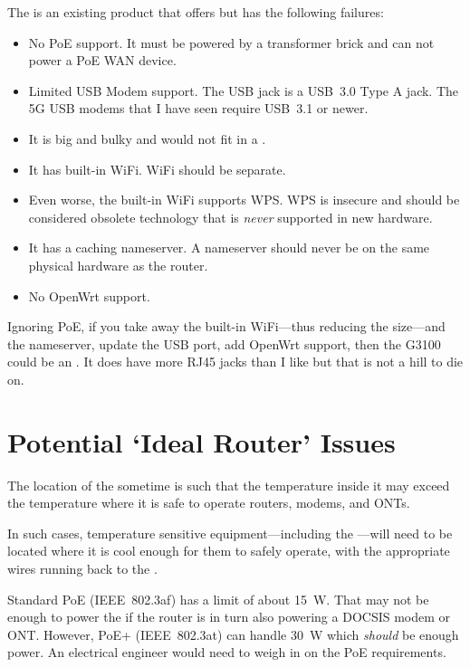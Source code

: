 The  is an existing product that offers  but has the
following failures:

\begin{itemize}
  \item No PoE support. It must be powered by a transformer brick and can not power a PoE WAN device.
  \item Limited USB Modem support. The USB jack is a USB~3.0 Type A jack. The 5G USB modems that I have seen
        require USB~3.1 or newer.
  \item It is big and bulky and would not fit in a \tcab{}.
  \item It has built-in WiFi. WiFi should be separate.
  \item Even worse, the built-in WiFi supports WPS. WPS is insecure and should be considered obsolete
        technology that is \emph{never} supported in new hardware.
  \item It has a caching nameserver. A nameserver should never be on the same physical hardware as the
        router.
  \item No OpenWrt support.
\end{itemize}

Ignoring PoE, if you take away the built-in WiFi---thus reducing the size---and the nameserver, update the USB port,
add OpenWrt support, then the G3100 could be an . It does have more RJ45 jacks than I like but
that is not a hill to die on.


\section{Potential `Ideal Router' Issues}

The location of the \tcab{} sometime is such that the temperature inside it
may exceed the temperature where it is safe to operate routers, modems, and ONTs.

In such cases, temperature sensitive equipment---including the ---will need to be
located where it is cool enough for them to safely operate, with the appropriate wires running back to the
\tcab{}.

Standard PoE (IEEE~802.3af) has a limit of about \SI{15}{\watt}. That may not be enough to power the
 if the router is in turn also powering a DOCSIS modem or ONT. However, PoE+ (IEEE~802.3at)
can handle \SI{30}{\watt} which \emph{should} be enough power. An electrical engineer would need to weigh in
on the PoE requirements.


